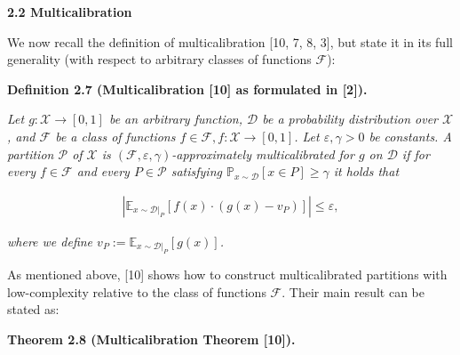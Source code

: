 \documentclass[10pt,a4paper]{article}
\begin{document}
\par\medskip\noindent\textbf{
2.2 Multicalibration}\par




We now recall the definition of multicalibration [10, 7, 8, 3], but state it in its full generality (with respect to arbitrary classes of functions $\mathcal{F}$):\par





\par\medskip\noindent\textbf{
\textbf{Definition 2.7}\textbf{ }(Multicalibration [10] as formulated in [2])\textbf{.}
}\par



\emph{Let $g:\mathcal{X}\rightarrow[0,1]$ be an arbitrary function, $\mathcal{D}$ be a probability distribution over $\mathcal{X}$, and $\mathcal{F}$ be a class of functions $f\in\mathcal{F},f:\mathcal{X}\rightarrow[0,1]$. Let $\varepsilon,\gamma>0$ be constants. A partition $\mathcal{P}$ of $\mathcal{X}$ is $(\mathcal{F},\varepsilon,\gamma)$-approximately multicalibrated for $g$ on $\mathcal{D}$ if for every $f\in\mathcal{F}$ and every $P\in\mathcal{P}$ satisfying $\mathbb{P}_{x\sim\mathcal{D}}[x\in P]\geq\gamma$ it holds that}\par


\[\begin{gathered}
\left|\mathbb{E}_{x\sim\mathcal{D}|_{P}}[f(x)\cdot(g(x)-v_{P})]\right|\leq\varepsilon,
\end{gathered}\]


\emph{where we define $v_{P}:=\mathbb{E}_{x\sim\mathcal{D}|_{P}}[g(x)]$.}\par






As mentioned above, [10] shows how to construct multicalibrated partitions with low-complexity relative to the class of functions $\mathcal{F}$. Their main result can be stated as:\par





\par\medskip\noindent\textbf{
\textbf{Theorem 2.8}\textbf{ }(Multicalibration Theorem [10])\textbf{.}
}\par
\end{document}
